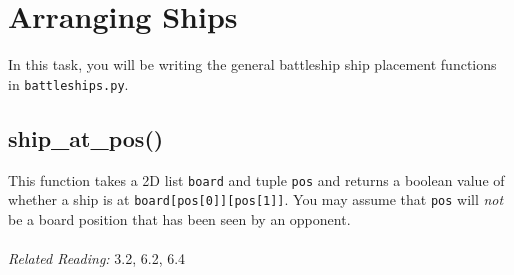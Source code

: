 \documentclass{article}
\begin{document}
\section{Arranging Ships}
In this task, you will be writing the general battleship ship placement functions in \texttt{battleships.py}.

\subsection{ship\_at\_pos()}
This function takes a 2D list \texttt{board} and tuple \texttt{pos} and returns a boolean value of whether a ship is at \texttt{board[pos[0]][pos[1]]}. You may assume that \texttt{pos} will \textit{not} be a board position that has been seen by an opponent.\\\\
\textit{Related Reading:} 3.2, 6.2, 6.4
\end{document}
